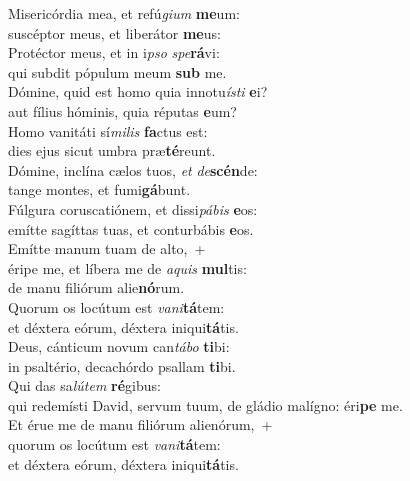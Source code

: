 \evenverse Misericórdia mea, et refú\textit{gi}\textit{um} \textbf{me}um:~\*\\
\evenverse suscéptor meus, et liberátor \textbf{me}us:\\
\oddverse Protéctor meus, et in i\textit{pso} \textit{spe}\textbf{rá}vi:~\*\\
\oddverse qui subdit pópulum meum \textbf{sub} me.\\
\evenverse Dómine, quid est homo quia innotu\textit{í}\textit{sti} \textbf{e}i?~\*\\
\evenverse aut fílius hóminis, quia réputas \textbf{e}um?\\
\oddverse Homo vanitáti sí\textit{mi}\textit{lis} \textbf{fa}ctus est:~\*\\
\oddverse dies ejus sicut umbra præ\textbf{té}reunt.\\
\evenverse Dómine, inclína cælos tuos, \textit{et} \textit{de}\textbf{scén}de:~\*\\
\evenverse tange montes, et fumi\textbf{gá}bunt.\\
\oddverse Fúlgura coruscatiónem, et dissi\textit{pá}\textit{bis} \textbf{e}os:~\*\\
\oddverse emítte sagíttas tuas, et conturbábis \textbf{e}os.\\
\evenverse Emítte manum tuam de alto,~+\\
\evenverse  éripe me, et líbera me de \textit{a}\textit{quis} \textbf{mul}tis:~\*\\
\evenverse de manu filiórum alie\textbf{nó}rum.\\
\oddverse Quorum os locútum est \textit{va}\textit{ni}\textbf{tá}tem:~\*\\
\oddverse et déxtera eórum, déxtera iniqui\textbf{tá}tis.\\
\evenverse Deus, cánticum novum can\textit{tá}\textit{bo} \textbf{ti}bi:~\*\\
\evenverse in psaltério, decachórdo psallam \textbf{ti}bi.\\
\oddverse Qui das sa\textit{lú}\textit{tem} \textbf{ré}gibus:~\*\\
\oddverse qui redemísti David, servum tuum, de gládio malígno: éri\textbf{pe} me.\\
\evenverse Et érue me de manu filiórum alienórum,~+\\
\evenverse  quorum os locútum est \textit{va}\textit{ni}\textbf{tá}tem:~\*\\
\evenverse et déxtera eórum, déxtera iniqui\textbf{tá}tis.\\
